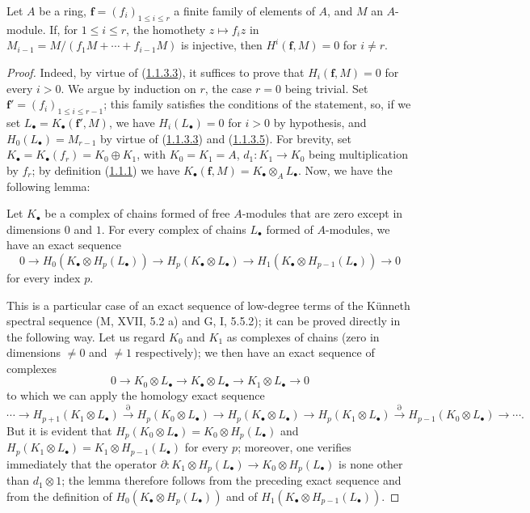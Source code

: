 \begin{proposition}[1.1.4]
\label{III.1.1.4}
Let $A$ be a ring, $\mathbf f=(f_i)_{1\leq i\leq r}$ a finite family
of elements of $A$, and $M$ an $A$-module. If, for $1\leq i\leq r$, the
homothety $z\mapsto f_i z$ in $M_{i-1}=M/(f_1M+\cdots+f_{i-1}M)$ is injective,
then $H^i(\mathbf f,M)=0$ for $i\neq r$.
\end{proposition}

\begin{proof}
Indeed, by virtue of (\hyperref[III.1.1.3.3]{1.1.3.3}), it suffices to
prove that $H_i(\mathbf f,M)=0$ for every $i>0$. We argue by induction on
$r$, the case $r=0$ being trivial. Set
$\mathbf f'=(f_i)_{1\leq i\leq r-1}$; this family satisfies the conditions of
the statement, so, if we set $L_\bullet=K_\bullet(\mathbf f',M)$, we have
$H_i(L_\bullet)=0$ for $i>0$ by hypothesis, and
$H_0(L_\bullet)=M_{r-1}$ by virtue of
(\hyperref[III.1.1.3.3]{1.1.3.3}) and
(\hyperref[III.1.1.3.5]{1.1.3.5}). For brevity, set
$K_\bullet=K_\bullet(f_r)=K_0\oplus K_1$, with $K_0=K_1=A$,
$d_1:K_1\to K_0$ being multiplication by $f_r$; by definition
(\hyperref[III.1.1.1]{1.1.1}) we have
$K_\bullet(\mathbf f,M)=K_\bullet\otimes_A L_\bullet$. Now, we have the
following lemma:

\begin{lemma}[1.1.4.1]
\label{III.1.1.4.1}
Let $K_\bullet$ be a complex of chains formed of free $A$-modules that are
zero except in dimensions $0$ and $1$. For every complex of chains $L_\bullet$
formed of $A$-modules, we have an exact sequence
\[
0\longrightarrow H_0(K_\bullet\otimes H_p(L_\bullet))
\longrightarrow H_p(K_\bullet\otimes L_\bullet)
\longrightarrow H_1(K_\bullet\otimes H_{p-1}(L_\bullet))
\longrightarrow0
\]
for every index $p$.
\end{lemma}

This is a particular case of an exact sequence of low-degree terms of the
Künneth spectral sequence (M, XVII, 5.2 a) and G, I, 5.5.2); it can be
proved directly in the following way. Let us regard $K_0$ and $K_1$ as
complexes of chains (zero in dimensions $\neq0$ and $\neq1$
respectively); we then have an exact sequence of complexes
\[
0\longrightarrow K_0\otimes L_\bullet
\longrightarrow K_\bullet\otimes L_\bullet
\longrightarrow K_1\otimes L_\bullet\longrightarrow0
\]
to which we can apply the homology exact sequence
\[
\cdots\longrightarrow H_{p+1}(K_1\otimes L_\bullet)
\xrightarrow{\partial}H_p(K_0\otimes L_\bullet)
\longrightarrow H_p(K_\bullet\otimes L_\bullet)
\longrightarrow H_p(K_1\otimes L_\bullet)
\xrightarrow{\partial}H_{p-1}(K_0\otimes L_\bullet)
\longrightarrow\cdots.
\]
But it is evident that
$H_p(K_0\otimes L_\bullet)=K_0\otimes H_p(L_\bullet)$ and
$H_p(K_1\otimes L_\bullet)=K_1\otimes H_{p-1}(L_\bullet)$ for every $p$;
moreover, one verifies immediately that the operator
$\partial:K_1\otimes H_p(L_\bullet)\to K_0\otimes H_p(L_\bullet)$ is none
other than $d_1\otimes1$; the lemma therefore follows from the preceding exact
sequence and from the definition of $H_0(K_\bullet\otimes H_p(L_\bullet))$ and
of $H_1(K_\bullet\otimes H_{p-1}(L_\bullet))$.


\end{proof}
